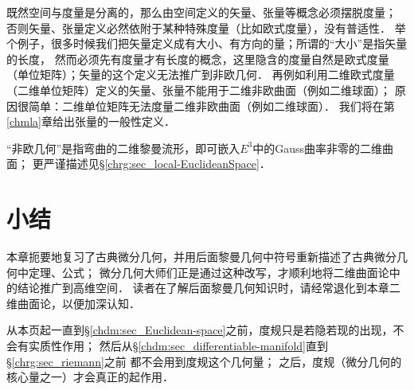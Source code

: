 既然空间与度量是分离的，那么由空间定义的矢量、张量等概念必须摆脱度量；
否则矢量、张量定义必然依附于某种特殊度量（比如欧式度量），没有普适性．
举个例子，很多时候我们把矢量定义成有大小、有方向的量；所谓的“大小”是指矢量的长度，
然而必须先有度量才有长度的概念，这里隐含的度量自然是欧式度量（单位矩阵）；矢量的这个定义无法推广到非欧几何．
再例如利用二维欧式度量（二维单位矩阵）定义的矢量、张量不能用于二维非欧曲面（例如二维球面）；
原因很简单：二维单位矩阵无法度量二维非欧曲面（例如二维球面）．
我们将在第\ref{chmla}章给出张量的一般性定义．

\begin{remark}
	“非欧几何”是指弯曲的二维黎曼流形，即可嵌入$E^3$中的Gauss曲率非零的二维曲面；
	更严谨描述见\S\ref{chrg:sec_local-EuclideanSpace}．
\end{remark}


\section*{小结}
本章扼要地复习了古典微分几何，并用后面黎曼几何中符号重新描述了古典微分几何中定理、公式；
微分几何大师们正是通过这种改写，才顺利地将二维曲面论中的结论推广到高维空间．
读者在了解后面黎曼几何知识时，请经常退化到本章二维曲面论，以便加深认知．


从本页起一直到\S\ref{chdm:sec_Euclidean-space}之前，度规只是若隐若现的出现，不会有实质性作用；
然后从\S\ref{chdm:sec_differentiable-manifold}直到\S\ref{chrg:sec_riemann}之前
都不会用到度规这个几何量；
之后，度规（微分几何的核心量之一）才会真正的起作用．


\printbibliography[heading=subbibliography,title=第\ref{chcdg}章参考文献]


\endinput
